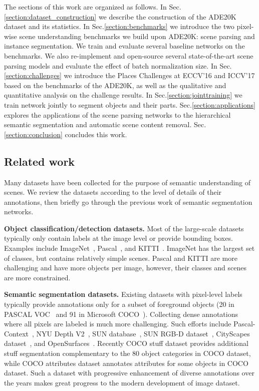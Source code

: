 The sections of this work are organized as follows. In Sec.\ref{section:dataset_construction} we describe the construction of the ADE20K dataset and its statistics. In Sec.\ref{section:benchmarks} we introduce the two pixel-wise scene understanding benchmarks we build upon ADE20K: scene parsing and instance segmentation. We train and evaluate several baseline networks on the benchmarks. We also re-implement and open-source several state-of-the-art scene parsing models and evaluate the effect of batch normalization size. In Sec.\ref{section:challenges} we introduce the Places Challenges at ECCV'16 and ICCV'17 based on the benchmarks of the ADE20K, as well as the qualitative and quantitative analysis on the challenge results. In Sec.\ref{section:jointtraining} we train network jointly to segment objects and their parts. Sec.\ref{section:applications} explores the applications of the scene parsing networks to the hierarchical semantic segmentation and automatic scene content removal. Sec.\ref{section:conclusion} concludes this work.

\subsection{Related work}

Many datasets have been collected for the purpose of semantic understanding of scenes. We review the datasets according to the level of details of their annotations, then briefly go through the previous work of semantic segmentation networks.

{\bf Object classification/detection datasets.} Most of the large-scale datasets typically only contain labels at the image level or provide bounding boxes. Examples include ImageNet~\citep{ILSVRC15}, Pascal~\citep{everingham2010pascal}, and KITTI~\citep{Geiger2012CVPR}. ImageNet has the largest set of classes, but contains relatively simple scenes. Pascal and KITTI are more challenging and have more objects per image, however, their classes and scenes are more constrained. 

{\bf Semantic segmentation datasets.} Existing datasets with pixel-level labels typically provide annotations only for a subset of foreground objects (20 in PASCAL VOC~\citep{everingham2010pascal} and 91 in Microsoft COCO~\citep{lin2014microsoft}). Collecting dense annotations where all pixels are labeled is much more challenging. Such efforts include Pascal-Context~\citep{mottaghi2014role}, NYU Depth V2~\citep{Silberman:ECCV12}, SUN database~\citep{xiao2010sun}, SUN RGB-D dataset~\citep{song2015sun}, CityScapes dataset~\citep{Cordts2015Cvprw}, and OpenSurfaces~\citep{bell13opensurfaces,bell2015material}. Recently COCO stuff dataset \cite{cocostuff} provides additional stuff segmentation complementary to the 80 object categories in COCO dataset, while COCO attributes dataset \cite{cocoattribute} annotates attributes for some objects in COCO dataset. Such a dataset with progressive enhancement of diverse annotations over the years makes great progress to the modern development of image dataset.

